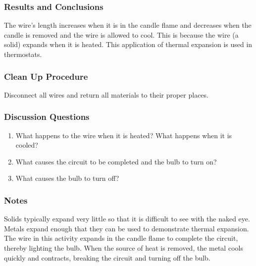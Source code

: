 \subsubsection*{Results and Conclusions}
The wire's length increases when it is in the candle flame and decreases when the candle is removed and the wire is allowed to cool. This is because the wire (a solid) expands when it is heated. This application of thermal expansion is used in thermostats.  

\subsubsection*{Clean Up Procedure}
Disconnect all wires and return all materials to their proper places.

\subsubsection*{Discussion Questions}
\begin{enumerate}
\item{What happens to the wire when it is heated? What happens when it is cooled?}
\item{What causes the circuit to be completed and the bulb to turn on?}
\item{What causes the bulb to turn off?}
\end{enumerate}

\subsubsection*{Notes}
Solids typically expand very little so that it is difficult to see with the naked eye. Metals expand enough that they can be used to demonstrate thermal expansion. The wire in this activity expands in the candle flame to complete the circuit, thereby lighting the bulb. When the source of heat is removed, the metal cools quickly and contracts, breaking the circuit and turning off the bulb.


